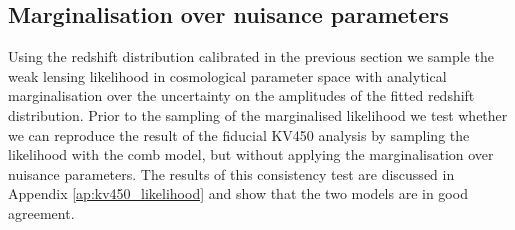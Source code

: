\documentclass{aa}
\begin{document}
\subsection{Marginalisation over nuisance parameters} 
Using the redshift distribution calibrated in the previous section we sample the weak lensing likelihood in cosmological parameter space with analytical marginalisation over the uncertainty on the amplitudes of the fitted redshift distribution. 
Prior to the sampling of the marginalised likelihood we test whether we can reproduce the result of the fiducial KV450 analysis by sampling the likelihood with the comb model, but without applying the marginalisation over nuisance parameters. The results of this consistency test are discussed in Appendix \ref{ap:kv450_likelihood} and show that the two models are in good agreement. 
\end{document}
